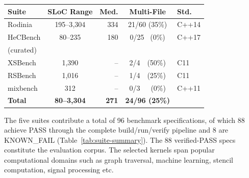 \documentclass{article}
\begin{document}
\begin{table}[!htbp]
{%
\begin{tabular}{@{}lcrcl@{}}
\toprule
Suite & SLoC Range & Med. & Multi-File & Std. \\
\midrule
Rodinia         & 195--3{,}304 & 334 & 21/60 (35\%) & C++14 \\
HeCBench &    80--235    & 180 &  0/25 ~(0\%) & C++17 \\
(curated) &  & & & \\
XSBench          &    1{,}390    &  -- &  2/4~~(50\%) & C11   \\
RSBench          &    1{,}016    &  -- &  1/4~~(25\%) & C11   \\
mixbench         &       312     &  -- &  0/3~~~(0\%) & C++11 \\
\midrule
\textbf{Total}   & \textbf{80--3{,}304} & \textbf{271} & \textbf{24/96 (25\%)} & \\
\bottomrule
\end{tabular}
}
\end{table}


The five suites contribute a total of 96 benchmark specifications, of which 88 achieve PASS through the complete build/run/verify pipeline and 8 are KNOWN\_FAIL (Table~\ref{tab:suite-summary}). The 88 verified-PASS specs constitute the evaluation corpus. The selected kernels span popular computational domains such as graph traversal, machine learning, stencil computation, signal processing etc.


\end{document}
